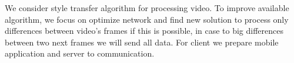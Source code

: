 \documentclass[../Main.tex]{subfiles}
\begin{document}
We consider style transfer algorithm for processing video. To improve available algorithm, we focus on optimize network and find new solution to process only differences between video's frames if this is possible, in case to big differences between two next frames we will send all data. For client we prepare mobile application and server to communication.


\par\vspace*{\fill} %


\biblio %
\end{document}
